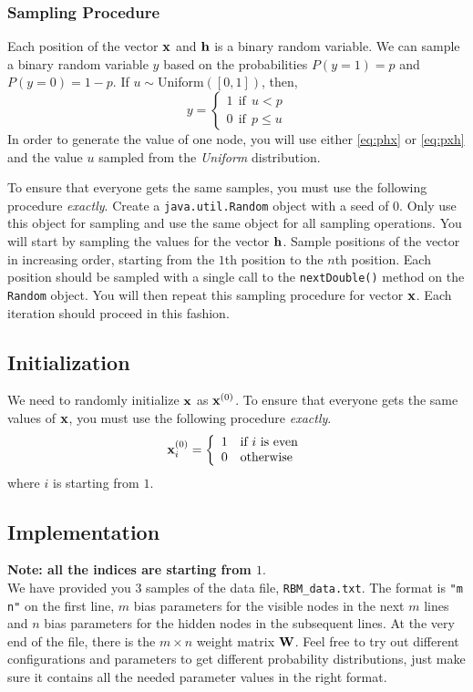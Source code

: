 \documentclass[11pt]{article}
\newcommand{\vx}{{\bf x}}
\newcommand{\vh}{{\bf h}}
\newcommand{\W}{{\bf W}}
\newcommand{\code}[1]{{\footnotesize \tt #1}}
\begin{document}
\subsubsection{Sampling Procedure}
Each position of the vector $\vx$ and $\vh$ is a binary random variable. We can sample a binary random variable $y$ based on the probabilities $P(y=1) = p$ and $P(y=0) = 1-p$. If $u \sim $Uniform$([0,1])$, then,
\begin{equation}
\label{eq:E4}
y =  \left\{
     \begin{array}{lr}
        1 ~~  \textrm{if} ~~  u < p  \\
        0 ~~ \textrm{if} ~~  p\leq u
     \end{array}
   \right.
\end{equation}
In order to generate the value of one node, you will use either \eqref{eq:phx} or \eqref{eq:pxh} and the value $u$ sampled from the \emph{Uniform} distribution.

To ensure that everyone gets the same samples, you must use the following procedure {\em exactly}. Create a \code{java.util.Random} object with
a seed of 0. Only use this object for sampling and use the same object for all sampling operations.
You will start by sampling the values for the vector $\vh$. Sample positions of the vector
in increasing order, starting from the $1$th position to the $n$th position. Each position should be sampled with a single call to
the \code{nextDouble()} method on the \code{Random} object. You will then repeat this sampling procedure for vector $\vx$. Each iteration
should proceed in this fashion.

\subsection{Initialization}
\label{sec:init}
We need to randomly initialize $\vx$ as $\vx^{(0)}$. To ensure that everyone gets the same values of $\vx$, you must use the following procedure {\em exactly}.
\begin{eqnarray}
\vx^{(0)}_{i}=\left\{ \begin{array}{ll}
1 & \textrm{if $i$ is even} \\
0 & \textrm{otherwise}
\end{array} \right.
\end{eqnarray}
where $i$ is starting from $1$.


\subsection{Implementation} %
\textbf{Note: all the indices are starting from $1$}.\\
We have provided you 3 samples of the data file, \code{RBM\_data.txt}. The format is \code{"m n"} on the first line, $m$ bias parameters for the visible nodes in the next $m$ lines and $n$ bias parameters for the hidden nodes in the subsequent lines. At the very end of the file, there is the $m \times n$ weight matrix $\W$.
Feel free to try out different configurations and parameters to get different probability distributions, just make sure it contains all the needed parameter values in the right format.
\end{document}
